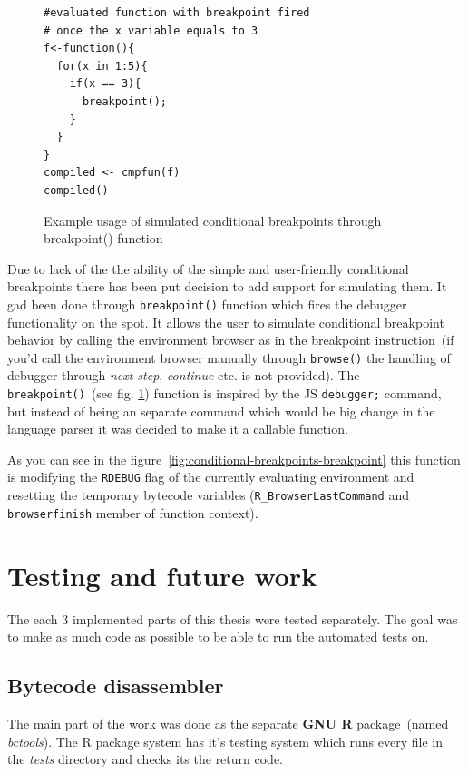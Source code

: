 \documentclass[thesis=M,english]{FITthesis}[2018/10/20]
\newcommand{\code}[1]{\texttt{#1}}
\begin{document}
{\begin{figure}[h]
\begin{lstlisting}
#evaluated function with breakpoint fired
# once the x variable equals to 3
f<-function(){
  for(x in 1:5){
    if(x == 3){
      breakpoint();
    }
  }
}
compiled <- cmpfun(f)
compiled()
\end{lstlisting}
	\caption{Example usage of simulated conditional breakpoints through breakpoint() function}\label{fig:example-of-conditional-breakpoints}
\end{figure}

Due to lack of the the ability of the simple and user-friendly conditional breakpoints there has been put decision to add support for simulating them. It gad been done through \code{breakpoint()} function which fires the debugger functionality on the spot. It allows the user to simulate conditional breakpoint behavior by calling the environment browser as in the breakpoint instruction~(if you'd call the environment browser manually through \code{browse()} the handling of debugger through \textit{next step}, \textit{continue} etc. is not provided). The \code{breakpoint()}~(see fig. \ref{fig:example-of-conditional-breakpoints}) function is inspired by the JS \code{debugger;} command, but instead of being an separate command which would be big change in the language parser it was decided to make it a callable function.

As you can see in the figure~\ref{fig:conditional-breakpoints-breakpoint} this function is modifying the \code{RDEBUG} flag of the currently evaluating environment and resetting the temporary bytecode variables (\code{R{\_}BrowserLastCommand} and \code{browserfinish} member of function context). 

\chapter{Testing and future work}

The each 3 implemented parts of this thesis were tested separately. The goal was to make as much code as possible to be able to run the automated tests on.

\section{Bytecode disassembler}

The main part of the work was done as the separate \textbf{GNU R} package~(named \textit{bctools}). The R package system has it's testing system which runs every file in the \textit{tests} directory and checks its the return code. 

}
\end{document}
